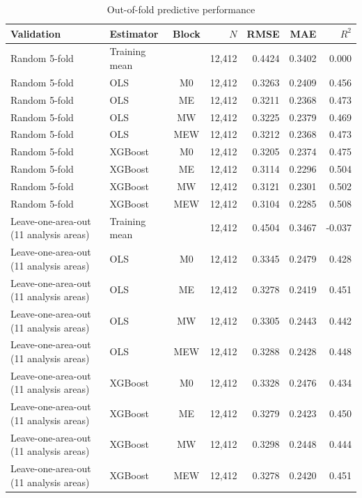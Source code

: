 \begin{landscape}
\begin{table}[p]
\centering
\small
\begin{threeparttable}
\caption{Out-of-fold predictive performance}\label{tab:predictive-performance}
\begin{tabular}{>{\raggedright\arraybackslash}p{4.2cm}>{\raggedright\arraybackslash}p{2.3cm}crrrr}
\toprule
Validation & Estimator & Block & $N$ & RMSE & MAE & $R^2$ \\
\midrule
Random 5-fold & Training mean & \textemdash{} & 12,412 & 0.4424 & 0.3402 & 0.000 \\
Random 5-fold & OLS & M0 & 12,412 & 0.3263 & 0.2409 & 0.456 \\
Random 5-fold & OLS & ME & 12,412 & 0.3211 & 0.2368 & 0.473 \\
Random 5-fold & OLS & MW & 12,412 & 0.3225 & 0.2379 & 0.469 \\
Random 5-fold & OLS & MEW & 12,412 & 0.3212 & 0.2368 & 0.473 \\
Random 5-fold & XGBoost & M0 & 12,412 & 0.3205 & 0.2374 & 0.475 \\
Random 5-fold & XGBoost & ME & 12,412 & 0.3114 & 0.2296 & 0.504 \\
Random 5-fold & XGBoost & MW & 12,412 & 0.3121 & 0.2301 & 0.502 \\
Random 5-fold & XGBoost & MEW & 12,412 & 0.3104 & 0.2285 & 0.508 \\
\addlinespace[0.4em]
Leave-one-area-out (11 analysis areas) & Training mean & \textemdash{} & 12,412 & 0.4504 & 0.3467 & -0.037 \\
Leave-one-area-out (11 analysis areas) & OLS & M0 & 12,412 & 0.3345 & 0.2479 & 0.428 \\
Leave-one-area-out (11 analysis areas) & OLS & ME & 12,412 & 0.3278 & 0.2419 & 0.451 \\
Leave-one-area-out (11 analysis areas) & OLS & MW & 12,412 & 0.3305 & 0.2443 & 0.442 \\
Leave-one-area-out (11 analysis areas) & OLS & MEW & 12,412 & 0.3288 & 0.2428 & 0.448 \\
Leave-one-area-out (11 analysis areas) & XGBoost & M0 & 12,412 & 0.3328 & 0.2476 & 0.434 \\
Leave-one-area-out (11 analysis areas) & XGBoost & ME & 12,412 & 0.3279 & 0.2423 & 0.450 \\
Leave-one-area-out (11 analysis areas) & XGBoost & MW & 12,412 & 0.3298 & 0.2448 & 0.444 \\
Leave-one-area-out (11 analysis areas) & XGBoost & MEW & 12,412 & 0.3278 & 0.2420 & 0.451 \\

\end{tabular}
\end{threeparttable}
\end{table}
\end{landscape}
